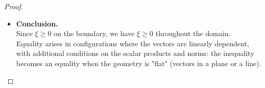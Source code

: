 \documentclass[a4paper,10pt]{article}
\theoremstyle{plain}
\theoremstyle{definition}
\theoremstyle{remark}
\begin{document}
\begin{proof}
\begin{itemize}
\begin{itemize}
\item If $x = \lambda y + \mu z$, then substitute
\begin{align*}
a^2 &= \lambda^2 b^2 + \mu^2 c^2 + 2 \lambda \mu r, \\
p &= \lambda b^2 + \mu r, \\
q &= \lambda r + \mu c^2.
\end{align*}
After substitution and simplification, $\xi$ factors as
\begin{equation*}
\xi  = \Bigl( b^2 c^2 - r^2 \Bigr)
       \Bigl( b^2 \lambda (\lambda + 1) + c^2 \mu (\mu + 1) + 2 \lambda (\mu + 1) r \Bigr)^2.
\end{equation*}
The first factor is nonnegative by the Cauchy-Schwarz inequality, and the second factor is a square, hence nonnegative. Therefore, $\xi \geq 0$.
\item If $y = \lambda x + \mu z$, then substitute
\begin{align*}
b^2 &= \lambda^2 a^2 + \mu^2 c^2 + 2 \lambda \mu q, \\
p &= \lambda a^2 + \mu q, \\
r &= \lambda q + \mu c^2.
\end{align*}
After substitution and simplification, $\xi$ factors as
\[
\xi = \left( a^2 c^2 - q^2 \right) \left( a^2 \lambda (\lambda + 1) + c^2 \mu (\mu + 1) + 2 \lambda (\mu + 1) q \right)^2.
\]
The first factor is nonnegative by the Cauchy-Schwarz inequality, and the second factor is a square, hence nonnegative. Therefore, $\xi \geq 0$.
\end{itemize}
Therefore, $\xi \geq 0$ on the boundary. 

\item \textbf{Conclusion.} \\
Since $\xi \geq 0$ on the boundary, we have $\xi \geq 0$ throughout the domain. \\
Equality arises in configurations where the vectors are linearly dependent, with additional conditions on the scalar products and norms: the inequality becomes an equality when the geometry is "flat" (vectors in a plane or a line).
\end{itemize}
\end{proof}
\end{document}

